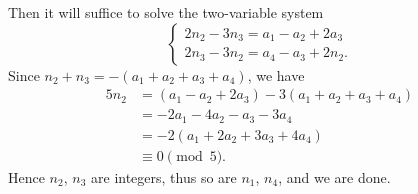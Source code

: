 Then it will suffice to solve the two-variable system
\[
    \begin{cases}
        2n_2-3n_3=a_1-a_2+2a_3\\
        2n_3-3n_2=a_4-a_3+2n_2.
    \end{cases}
\]
Since $n_2+n_3=-(a_1+a_2+a_3+a_4)$, we have
\begin{align*}
    5n_2&=(a_1-a_2+2a_3)-3(a_1+a_2+a_3+a_4)\\
    &=-2a_1-4a_2-a_3-3a_4\\
    &=-2(a_1+2a_2+3a_3+4a_4)\\
    &\equiv0\pmod5.
\end{align*}
Hence $n_2$, $n_3$ are integers, thus so are $n_1$, $n_4$, and we are done.

